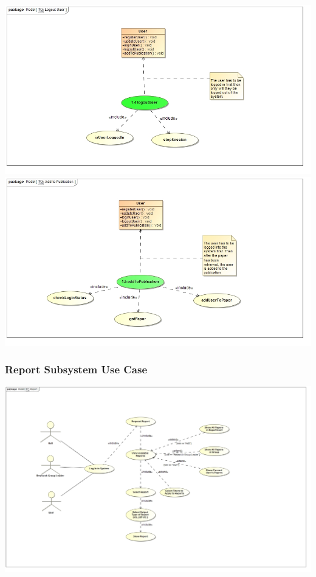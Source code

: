 \documentclass{article}
\begin{document}
	\includegraphics[width=\textwidth]{LogoutUser}
	\includegraphics[width=\textwidth]{AddtoPublication}
	\subsubsection{Report Subsystem Use Case}
	\includegraphics[width=\textwidth]{ReportUseCase}
\end{document}
